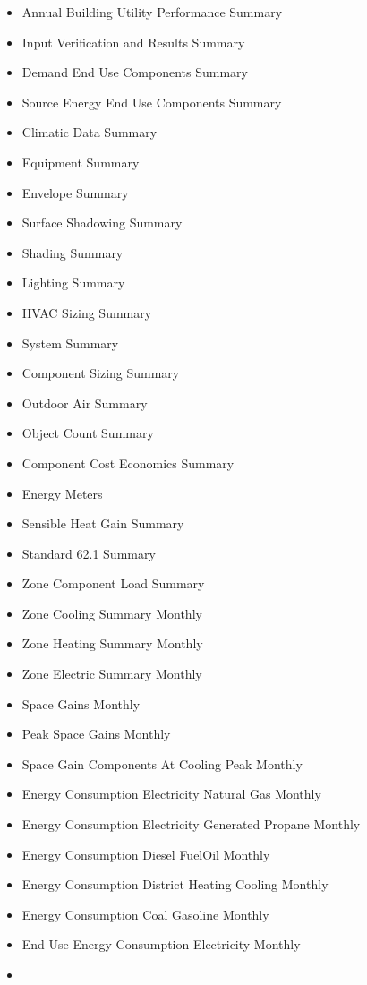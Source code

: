 \begin{itemize}
\item
  Annual Building Utility Performance Summary
\item
  Input Verification and Results Summary
\item
  Demand End Use Components Summary
\item
  Source Energy End Use Components Summary
\item
  Climatic Data Summary
\item
  Equipment Summary
\item
  Envelope Summary
\item
  Surface Shadowing Summary
\item
  Shading Summary
\item
  Lighting Summary
\item
  HVAC Sizing Summary
\item
  System Summary
\item
  Component Sizing Summary
\item
  Outdoor Air Summary
\item
  Object Count Summary
\item
  Component Cost Economics Summary
\item
  Energy Meters
\item
  Sensible Heat Gain Summary
\item
  Standard 62.1 Summary
\item
  Zone Component Load Summary
\item
  Zone Cooling Summary Monthly
\item
  Zone Heating Summary Monthly
\item
  Zone Electric Summary Monthly
\item
  Space Gains Monthly
\item
  Peak Space Gains Monthly
\item
  Space Gain Components At Cooling Peak Monthly
\item
  Energy Consumption Electricity Natural Gas Monthly
\item
  Energy Consumption Electricity Generated Propane Monthly
\item
  Energy Consumption Diesel FuelOil Monthly
\item
  Energy Consumption District Heating Cooling Monthly
\item
  Energy Consumption Coal Gasoline Monthly
\item
  End Use Energy Consumption Electricity Monthly
\item

\end{itemize}
